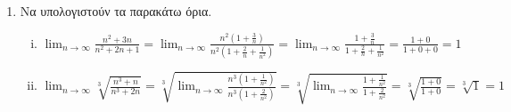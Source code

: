 \begin{enumerate}
\begin{proof}
\begin{enumerate}[i)]
                \begin{align*}
                    \lim_{n \to \infty} a_{2n-1} = \lim_{n \to \infty} (-1)^{2n-1} 
                    \frac{2n-1 +3}{2 \cdot (2n-1)} = \lim_{n \to \infty} - 
                    \frac{2n+2}{4n-2} = - \lim_{n \to \infty} 
                    \frac{n(2+ \frac{2}{n})}{n(4- \frac{2}{n})} = - \lim_{n \to \infty}
                    \frac{2 + \frac{2}{n}}{4 - \frac{2}{n}} = - \frac{1}{2}
                \end{align*}

                 Επειδή $ \lim_{n \to \infty} a_{2n} \neq \lim_{n \to \infty} a_{2n-1} $
                 η ακολουθία $ (a_{n})_{n \in \mathbb{N}} $ δε συγκλίνει.

             \item Η ακολουθία $(\lambda n)_{n \in \mathbb{N}} $ δε συγκλίνει, διότι 
                 δεν είναι φραγμένη. Πράγματι, γιατί αν $ (a_{n})_{n \in \mathbb{N}} $
                 είναι φραγμένη, τότε
                 \[
                     \abs{a_{n}} = \abs{\lambda n} \overset{\lambda >0}{=} 
                     \lambda n \leq a, \; \forall n \in \mathbb{N} \Leftrightarrow 
                     n \leq \frac{a}{\lambda}, \; \forall n \in \mathbb{N} \; 
                     \text{άτοπο, γιατι $ \mathbb{N} $ όχι άνω φραγμένο}
                  \] 
        \end{enumerate}    
        \end{proof}

    \item Να υπολογιστούν τα παρακάτω όρια.

        \begin{enumerate}[i)]
            \item $ \lim_{n \to \infty} \frac{n^{2}+3n}{n^{2}+2n+1} = 
                \lim_{n \to \infty} \frac{n^{2}(1+ \frac{3}{n})}{n^{2}(1+ \frac{2}{n} 
                + \frac{1}{n^{2}})} = \lim_{n \to \infty} 
                \frac{1+ \frac{3}{n}}{1+ \frac{2}{n} + \frac{1}{n^{2}}} = 
                \frac{1+0}{1+0+0} = 1 $ 

            \item $ \lim_{n \to \infty} \sqrt[3]{\frac{n^{3}+n}{n^{3}+2n}} = 
                \sqrt[3]{\lim_{n \to \infty} \frac{n^{3}(1+ 
                \frac{1}{n^{2}})}{n^{3}(1+ \frac{2}{n^{2}})}} = 
                \sqrt[3]{\lim_{n \to \infty} \frac{1+ \frac{1}{n^{2}}}{1+
                \frac{2}{n^{2}}}} = \sqrt[3]{\frac{1+0}{1+0}} = \sqrt[3]{1} = 1  $
        \end{enumerate}
       

\end{enumerate}
